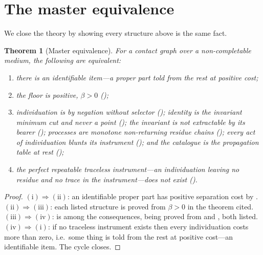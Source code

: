 \documentclass[11pt,twocolumn,a4paper]{article}
\theoremstyle{dirthm}
\newtheorem{theorem}{Theorem}[section]
\theoremstyle{definition}
\theoremstyle{remark}
\newcommand{\flo}{\beta}
\begin{document}
\section{The master equivalence}
\label{sec:master}

We close the theory by showing every structure above is the same fact.

\begin{theorem}[Master equivalence]
\label{thm:master}
For a contact graph over a non-completable medium, the following are
equivalent:
\begin{enumerate}[label=\textup{(\roman*)},leftmargin=2.0em,itemsep=1pt]
\item there is an identifiable item---a proper part told from the rest at
positive cost;
\item the floor is positive, $\flo>0$ ();
\item individuation is by negation without selector ();
identity is the invariant minimum cut and never a point
(); the invariant is not extractable by its
bearer (); processes are monotone non-returning
residue chains (); every act of
individuation blunts its instrument (); and the catalogue is
the propagation table at rest ();
\item the perfect repeatable traceless instrument---an individuation leaving
no residue and no trace in the instrument---does not exist
().
\end{enumerate}
\end{theorem}

\begin{proof}
$(\mathrm{i})\Rightarrow(\mathrm{ii})$: an identifiable proper part has
positive separation cost by .
$(\mathrm{ii})\Rightarrow(\mathrm{iii})$: each listed structure is proved from
$\flo>0$ in the theorem cited.
$(\mathrm{iii})\Rightarrow(\mathrm{iv})$:  is among the
consequences, being proved from  and , both
listed.
$(\mathrm{iv})\Rightarrow(\mathrm{i})$: if no traceless instrument exists then
every individuation costs more than zero, i.e.\ some thing is told from the
rest at positive cost---an identifiable item. The cycle closes.
\end{proof}
\end{document}
